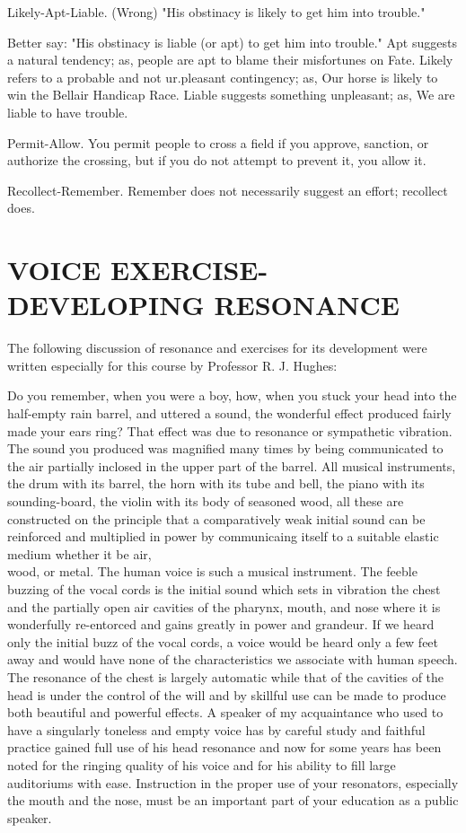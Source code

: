 \documentclass[10pt]{article}
\begin{document}
Likely-Apt-Liable. (Wrong) "His obstinacy is likely to get him into trouble."

Better say: "His obstinacy is liable (or apt) to get him into trouble." Apt suggests a natural tendency; as, people are apt to blame their misfortunes on Fate. Likely refers to a probable and not ur.pleasant contingency; as, Our horse is likely to win the Bellair Handicap Race. Liable suggests something unpleasant; as, We are liable to have trouble.

Permit-Allow. You permit people to cross a field if you approve, sanction, or authorize the crossing, but if you do not attempt to prevent it, you allow it.

Recollect-Remember. Remember does not necessarily suggest an effort; recollect does.

\section*{VOICE EXERCISE-DEVELOPING RESONANCE}
The following discussion of resonance and exercises for its development were written especially for this course by Professor R. J. Hughes:

Do you remember, when you were a boy, how, when you stuck your head into the half-empty rain barrel, and uttered a sound, the wonderful effect produced fairly made your ears ring? That effect was due to resonance or sympathetic vibration. The sound you produced was magnified many times by being communicated to the air partially inclosed in the upper part of the barrel. All musical instruments, the drum with its barrel, the horn with its tube and bell, the piano with its sounding-board, the violin with its body of seasoned wood, all these are constructed on the principle that a comparatively weak initial sound can be reinforced and multiplied in power by communicaing itself to a suitable elastic medium whether it be air,\\
wood, or metal. The human voice is such a musical instrument. The feeble buzzing of the vocal cords is the initial sound which sets in vibration the chest and the partially open air cavities of the pharynx, mouth, and nose where it is wonderfully re-entorced and gains greatly in power and grandeur. If we heard only the initial buzz of the vocal cords, a voice would be heard only a few feet away and would have none of the characteristics we associate with human speech. The resonance of the chest is largely automatic while that of the cavities of the head is under the control of the will and by skillful use can be made to produce both beautiful and powerful effects. A speaker of my acquaintance who used to have a singularly toneless and empty voice has by careful study and faithful practice gained full use of his head resonance and now for some years has been noted for the ringing quality of his voice and for his ability to fill large auditoriums with ease. Instruction in the proper use of your resonators, especially the mouth and the nose, must be an important part of your education as a public speaker.
\end{document}

